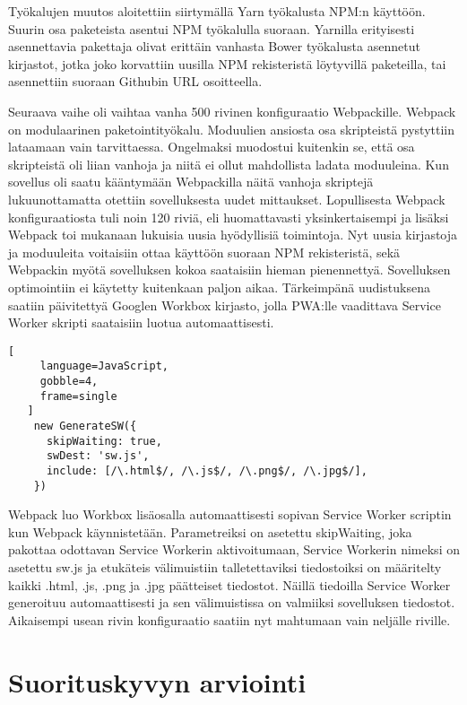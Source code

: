 \documentclass{tktltiki}
\begin{document}
Työkalujen muutos aloitettiin siirtymällä Yarn työkalusta NPM:n käyttöön. Suurin osa paketeista asentui NPM työkalulla suoraan. Yarnilla erityisesti asennettavia pakettaja olivat erittäin vanhasta Bower työkalusta asennetut kirjastot, jotka joko korvattiin uusilla NPM rekisteristä löytyvillä paketeilla, tai asennettiin suoraan Githubin URL osoitteella. 

Seuraava vaihe oli vaihtaa vanha 500 rivinen konfiguraatio Webpackille. Webpack on modulaarinen paketointityökalu. Moduulien ansiosta osa skripteistä pystyttiin lataamaan vain tarvittaessa. Ongelmaksi muodostui kuitenkin se, että osa skripteistä oli liian vanhoja ja niitä ei ollut mahdollista ladata moduuleina. Kun sovellus oli saatu kääntymään Webpackilla näitä vanhoja skriptejä lukuunottamatta otettiin sovelluksesta uudet mittaukset. Lopullisesta Webpack konfiguraatiosta tuli noin 120 riviä, eli huomattavasti yksinkertaisempi ja lisäksi Webpack toi mukanaan lukuisia uusia hyödyllisiä toimintoja. Nyt uusia kirjastoja ja moduuleita voitaisiin ottaa käyttöön suoraan NPM rekisteristä, sekä Webpackin myötä sovelluksen kokoa saataisiin hieman pienennettyä. Sovelluksen optimointiin ei käytetty kuitenkaan paljon aikaa. Tärkeimpänä uudistuksena saatiin päivitettyä Googlen Workbox kirjasto, jolla PWA:lle vaadittava Service Worker skripti saataisiin luotua automaattisesti.

\begin{lstlisting}[
     language=JavaScript,
     gobble=4,
     frame=single
   ]
    new GenerateSW({
      skipWaiting: true,
      swDest: 'sw.js',
      include: [/\.html$/, /\.js$/, /\.png$/, /\.jpg$/],
    })
\end{lstlisting}

Webpack luo Workbox lisäosalla automaattisesti sopivan Service Worker scriptin kun Webpack käynnistetään. Parametreiksi on asetettu skipWaiting, joka pakottaa odottavan Service Workerin aktivoitumaan, Service Workerin nimeksi on asetettu sw.js ja etukäteis välimuistiin talletettaviksi tiedostoiksi on määritelty kaikki .html, .js, .png ja .jpg päätteiset tiedostot. Näillä tiedoilla Service Worker generoituu automaattisesti ja sen välimuistissa on valmiiksi sovelluksen tiedostot. Aikaisempi usean rivin konfiguraatio saatiin nyt mahtumaan vain neljälle riville. 

\clearpage
\section{Suorituskyvyn arviointi}
\end{document}
